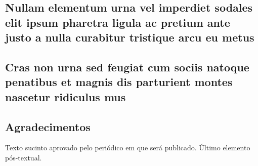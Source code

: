 \documentclass[
article,			%
11pt,				%
oneside,			%
a4paper,			%
english,			%
brazil,				%
sumario=tradicional
]{abntex2}
\begin{document}
	
	
	\begin{apendicesenv}
		
		\chapter{Nullam elementum urna vel imperdiet sodales elit ipsum pharetra ligula
			ac pretium ante justo a nulla curabitur tristique arcu eu metus}
		\lipsum[55-56]
		
	\end{apendicesenv}
	
	\begin{anexosenv}
		
		\chapter{Cras non urna sed feugiat cum sociis natoque penatibus et magnis dis
			parturient montes nascetur ridiculus mus}
		
		\lipsum[31]
		
	\end{anexosenv}
	
	
	\section*{Agradecimentos}
	Texto sucinto aprovado pelo periódico em que será publicado. Último 
	elemento pós-textual.
	
\end{document}
